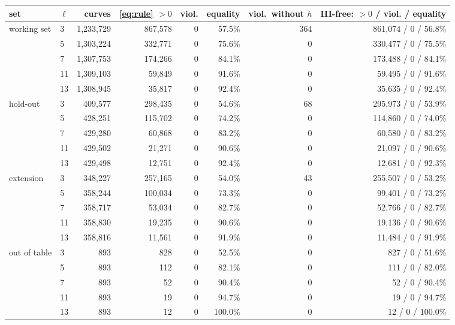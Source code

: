 \begin{tabular}{llrrrrrr}
\toprule
set & $\ell$ & curves & \eqref{eq:rule} $>0$ & viol. & equality & viol.\ without $h$ & III-free: $>0$ / viol. / equality\\
\midrule
working set & 3 & 1,233,729 & 867,578 & 0 & 57.5\% & 364 & 861,074 / 0 / 56.8\% \\
 & 5 & 1,303,224 & 332,771 & 0 & 75.6\% & 0 & 330,477 / 0 / 75.5\% \\
 & 7 & 1,307,753 & 174,266 & 0 & 84.1\% & 0 & 173,488 / 0 / 84.1\% \\
 & 11 & 1,309,103 & 59,849 & 0 & 91.6\% & 0 & 59,495 / 0 / 91.6\% \\
 & 13 & 1,308,945 & 35,817 & 0 & 92.4\% & 0 & 35,635 / 0 / 92.4\% \\
\midrule
hold-out & 3 & 409,577 & 298,435 & 0 & 54.6\% & 68 & 295,973 / 0 / 53.9\% \\
 & 5 & 428,251 & 115,702 & 0 & 74.2\% & 0 & 114,860 / 0 / 74.0\% \\
 & 7 & 429,280 & 60,868 & 0 & 83.2\% & 0 & 60,580 / 0 / 83.2\% \\
 & 11 & 429,502 & 21,271 & 0 & 90.6\% & 0 & 21,097 / 0 / 90.6\% \\
 & 13 & 429,498 & 12,751 & 0 & 92.4\% & 0 & 12,681 / 0 / 92.3\% \\
\midrule
extension & 3 & 348,227 & 257,165 & 0 & 54.0\% & 43 & 255,507 / 0 / 53.2\% \\
 & 5 & 358,244 & 100,034 & 0 & 73.3\% & 0 & 99,401 / 0 / 73.2\% \\
 & 7 & 358,717 & 53,034 & 0 & 82.7\% & 0 & 52,766 / 0 / 82.7\% \\
 & 11 & 358,830 & 19,235 & 0 & 90.6\% & 0 & 19,136 / 0 / 90.6\% \\
 & 13 & 358,816 & 11,561 & 0 & 91.9\% & 0 & 11,484 / 0 / 91.9\% \\
\midrule
out of table & 3 & 893 & 828 & 0 & 52.5\% & 0 & 827 / 0 / 51.6\% \\
 & 5 & 893 & 112 & 0 & 82.1\% & 0 & 111 / 0 / 82.0\% \\
 & 7 & 893 & 52 & 0 & 90.4\% & 0 & 52 / 0 / 90.4\% \\
 & 11 & 893 & 19 & 0 & 94.7\% & 0 & 19 / 0 / 94.7\% \\
 & 13 & 893 & 12 & 0 & 100.0\% & 0 & 12 / 0 / 100.0\% \\
\bottomrule
\end{tabular}
